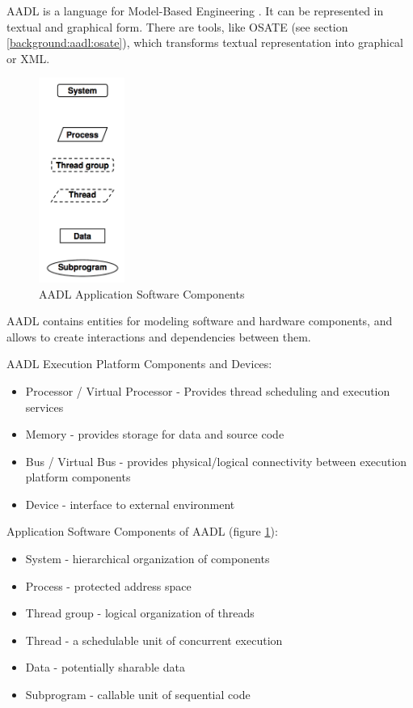 AADL is a language for Model-Based Engineering \cite{AadlBook}. It can be represented in textual and graphical form. There are tools, like OSATE (see section \ref{background:aadl:osate}), which transforms textual representation into graphical or XML. 

\begin{figure}
  \begin{center}
    \includegraphics[width=0.25\textwidth]{figures/aadl-app-components.png}
  \end{center}
  \caption{AADL Application Software Components}
  \label{figure:aadl_app_software_components}
\end{figure}

AADL contains entities for modeling software and hardware components, and allows to create interactions and dependencies between them.

AADL Execution Platform Components and Devices:
\begin{itemize}
	\item Processor / Virtual Processor - Provides thread scheduling and execution services
	\item Memory - provides storage for data and source code
	\item Bus / Virtual Bus - provides physical/logical connectivity between execution platform components
	\item Device - interface to external environment
\end{itemize}

Application Software Components of AADL (figure \ref{figure:aadl_app_software_components}):
\begin{itemize}
	\item System - hierarchical organization of components
	\item Process - protected address space
	\item Thread group - logical organization of threads
	\item Thread - a schedulable unit of concurrent execution
	\item Data - potentially sharable data
	\item Subprogram - callable unit of sequential code
\end{itemize}

